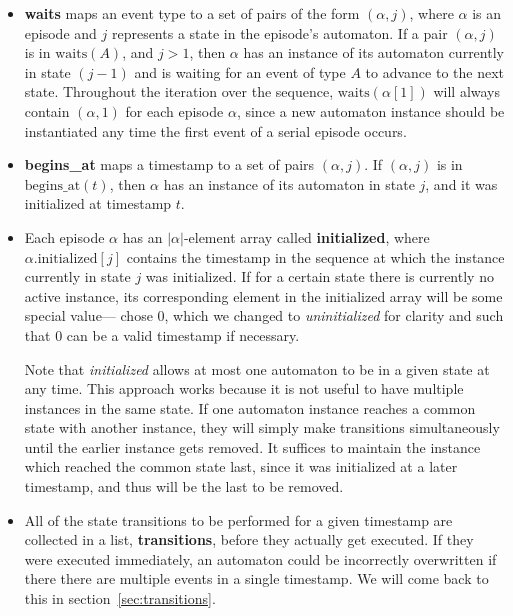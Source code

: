 \begin{itemize}
\item \textbf{waits} maps an event type to a set of pairs of the form $ (\alpha, j) $, where $ \alpha $ is an episode and $ j $ represents a state in the episode's automaton. If a pair $ (\alpha, j) $ is in $ \text{waits}(A) $, and $ j > 1 $, then $ \alpha $ has an instance of its automaton currently in state $ (j - 1) $ and is waiting for an event of type $ A $ to advance to the next state. Throughout the iteration over the sequence, $ \text{waits}(\alpha[1]) $ will always contain $ (\alpha, 1) $ for each episode $ \alpha $, since a new automaton instance should be instantiated any time the first event of a serial episode occurs.
\item \textbf{begins\_at} maps a timestamp to a set of pairs $ (\alpha, j) $. If $ (\alpha, j) $ is in $ \text{begins\_at}(t) $, then $ \alpha $ has an instance of its automaton in state $ j $, and it was initialized at timestamp $ t $.
\item Each episode $ \alpha $ has an $ | \alpha | $-element array called \textbf{initialized}, where $ \alpha \text{.initialized}[j] $ contains the timestamp in the sequence at which the instance currently in state $ j $ was initialized. If for a certain state there is currently no active instance, its corresponding element in the initialized array will be some special value---\cite{mannila1997discovery} chose 0, which we changed to \emph{uninitialized} for clarity and such that 0 can be a valid timestamp if necessary.

Note that \emph{initialized} allows at most one automaton to be in a given state at any time. This approach works because it is not useful to have multiple instances in the same state. If one automaton instance reaches a common state with another instance, they will simply make transitions simultaneously until the earlier instance gets removed. It suffices to maintain the instance which reached the common state last, since it was initialized at a later timestamp, and thus will be the last to be removed.
\item All of the state transitions to be performed for a given timestamp are collected in a list, \textbf{transitions}, before they actually get executed. If they were executed immediately, an automaton could be incorrectly overwritten if there there are multiple events in a single timestamp. We will come back to this in section~\ref{sec:transitions}.
\end{itemize}

